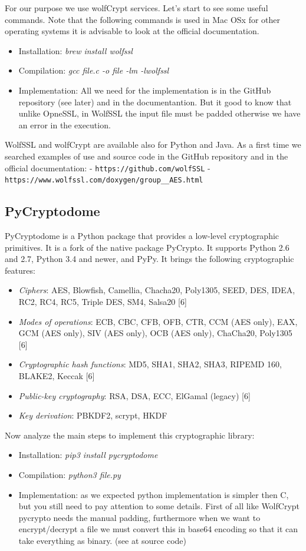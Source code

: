 \documentclass[11pt]{article}
\begin{document}
For our purpose we use wolfCrypt services. Let's start to see some useful commands. Note that the following commands is used in Mac OSx for other operating systems it is advisable to look at the official documentation.
\begin{itemize}
\item Installation: {\em brew install wolfssl}
\item Compilation: {\em gcc file.c -o file -lm -lwolfssl}
\item Implementation: All we need for the implementation is in the GitHub repository (see later) and in the documentantion. But it good to know that unlike OpneSSL, in WolfSSL the input file must be padded otherwise we have an error in the execution.
\end{itemize}

WolfSSL and wolfCrypt are available also for Python and Java. As a first time we searched examples of use and source code in the GitHub repository and in the official documentation:\newline
- \verb|https://github.com/wolfSSL|\newline
- \verb|https://www.wolfssl.com/doxygen/group__AES.html|

\subsection{PyCryptodome}
PyCryptodome is a Python package that provides a low-level cryptographic primitives. It is a fork of the native package PyCrypto. It supports Python 2.6 and 2.7, Python 3.4 and newer, and PyPy. It brings the following cryptographic features:

\begin{itemize}
  \item {\em Ciphers}: AES, Blowfish, Camellia, Chacha20, Poly1305, SEED, DES, IDEA, RC2, RC4, RC5, Triple DES, SM4, Salsa20 [6]
  \item {\em Modes of operations}: ECB, CBC, CFB, OFB, CTR, CCM (AES only), EAX, GCM (AES only), SIV (AES only), OCB (AES only), ChaCha20, Poly1305 [6]
  \item {\em Cryptographic hash functions}: MD5, SHA1, SHA2, SHA3, RIPEMD 160, BLAKE2, Keccak [6]
  \item {\em Public-key cryptography}: RSA, DSA, ECC, ElGamal (legacy)  [6]
  \item {\em Key derivation}: PBKDF2, scrypt, HKDF
\end{itemize}

Now analyze the main steps to implement this cryptographic library:
\begin{itemize}
\item Installation: {\em pip3 install pycryptodome}
\item Compilation: {\em python3 file.py}
\item Implementation: as we expected python implementation is simpler then C, but you still need to pay attention to some details. First of all like WolfCrypt pycrypto needs the manual padding, furthermore when we want to encrypt/decrypt a file we must convert this in base64 encoding so that it can take everything as binary. (see at source code)
\end{itemize}
\end{document}
